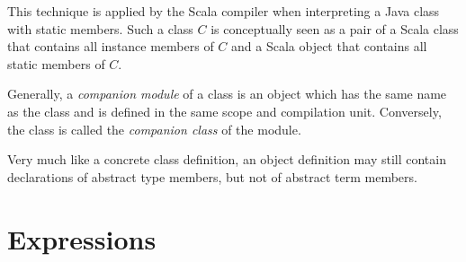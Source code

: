 This technique is applied by the Scala compiler when interpreting a
Java class with static members. Such a class $C$ is conceptually seen
as a pair of a Scala class that contains all instance members of $C$
and a Scala object that contains all static members of $C$.

Generally, a {\em companion module} of a class is an object which has
the same name as the class and is defined in the same scope and
compilation unit. Conversely, the class is called the {\em companion class}
of the module.

Very much like a concrete class definition, an object definition may
still contain declarations of abstract type members, but not of
abstract term members.



\chapter{Expressions}
\label{sec:exprs}

